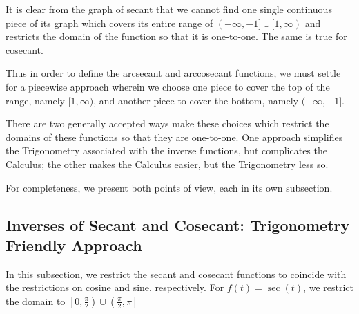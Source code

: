 \documentclass{ximera}
\begin{document}
\bigskip

It is clear from the graph of secant that we cannot find one single continuous piece of its graph which covers its entire range of $(-\infty, -1] \cup [1, \infty)$ and restricts the domain of the function so that it is one-to-one.  The same is true for cosecant.  

\smallskip

Thus in order to define the arcsecant and arccosecant functions, we must settle for a piecewise approach wherein we choose one piece to cover the top of the range, namely  $[1, \infty)$, and another piece to cover the bottom, namely $(-\infty, -1]$.  

\smallskip

There are two generally accepted ways make these choices which restrict the domains of these functions so that they are one-to-one.  One approach simplifies the Trigonometry associated with the inverse functions, but complicates the Calculus;  the other makes the Calculus easier, but the Trigonometry less so. 

\smallskip

For completeness,  we present both points of view, each in its own subsection.


\subsection{Inverses of Secant and Cosecant: Trigonometry Friendly Approach}
\label{arcsecanttrigfriendly}

In this subsection, we restrict the secant and cosecant functions to coincide with the restrictions on cosine and sine, respectively.  For $f(t) = \sec(t)$, we restrict the domain to $\left[0, \frac{\pi}{2}\right) \cup \left( \frac{\pi}{2}, \pi\right]$ 
\end{document}
